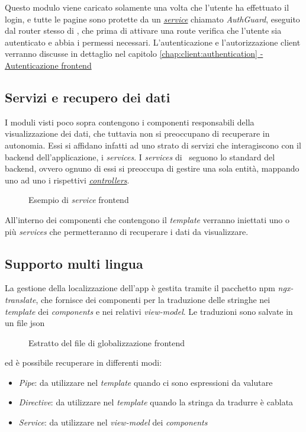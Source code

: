 \noindent
Questo modulo viene caricato solamente una volta che l'utente ha effettuato il login, e tutte le pagine sono protette da un \hyperref[chap:client:services]{\textit{service}} chiamato \textit{AuthGuard}, eseguito dal router stesso di \angular, che prima di attivare una route verifica che l'utente sia autenticato e abbia i permessi necessari. L'autenticazione e l'autorizzazione client verranno discusse in dettaglio nel capitolo \hyperref[chap:client:authentication]{\ref{chap:client:authentication} - Autenticazione \gls{frontend}}

\subsection{Servizi e recupero dei dati}
\label{client:services}
I moduli visti poco sopra contengono i componenti responsabili della visualizzazione dei dati, che tuttavia non si preoccupano di recuperare in autonomia. Essi si affidano infatti ad uno strato di servizi che interagiscono con il \gls{backend} dell'applicazione, i \textit{services}.
I \textit{services} di \angular~seguono lo standard del \gls{backend}, ovvero ognuno di essi si preoccupa di gestire una sola entità, mappando uno ad uno i rispettivi \hyperref[server:controllers]{\textit{controllers}}.
 \begin{figure}[!h] 
 	\centering    
 	
 	\caption[Esempio di \textit{service} \gls{frontend}]{Esempio di \textit{service} \gls{frontend}}
 	\label{fig:client-service}
 \end{figure}
All'interno dei componenti che contengono il \textit{template} verranno iniettati uno o più \textit{services} che permetteranno di recuperare i dati da visualizzare.

 \subsection{Supporto multi lingua}
 La gestione della localizzazione dell'app è gestita tramite il pacchetto \acrshort{npm} \textit{ngx-translate}, che fornisce dei componenti per la traduzione delle stringhe nei \textit{template} dei \textit{components} e nei relativi \textit{view-model}. Le traduzioni sono salvate in un file \acrshort{json}
 \begin{figure}[H] 
	\centering    
	
	\caption[Estratto del file di globalizzazione \gls{frontend}]{Estratto del file di globalizzazione \gls{frontend}}
	\label{fig:client-globalization}
\end{figure}
\noindent
ed è possibile recuperare in differenti modi:
\begin{itemize}
	\item \textit{Pipe}: da utilizzare nel \textit{template} quando ci sono espressioni da valutare
	\item \textit{Directive}: da utilizzare nel \textit{template} quando la stringa da tradurre è cablata
	\item \textit{Service}: da utilizzare nel \textit{view-model} dei \textit{components}
\end{itemize}

